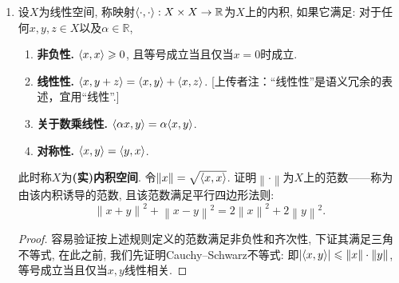 \begin{3b}
\begin{enumerate}
\begin{proof}
\begin{itemize}
\item $\partial(E')\subseteq\partial E\cap E'$:
对 $E_1$ 取等；对 $E_2$ 严格（左边 $\varnothing$，右边 $\mathbb{R}$）.

\item $(\partial E)'\subseteq\partial E\cap E'$:
对 $E_2$ 取等（均为 $\mathbb{R}$）；对 $E_1$ 严格（左边 $\varnothing$，右边 $\{0,1\}$）.

\item $\partial(\partial E)\subseteq\partial E$:
对 $E_1$ 取等（均为 $\{0,1\}$）；对 $E_3$ 严格（$\partial E_3=[0,1],\ \partial(\partial E_3)=\{0,1\}$）.

\item $(\overline{E})^\circ\supseteq E^\circ$:
对 $E_1$ 取等；对 $E_2$ 严格（$\mathbb{R}\supsetneq\varnothing$）.

\item $\partial(\overline{E})\subseteq\partial E$:
对 $E_1$ 取等；对 $E_3$ 严格（$\partial(\overline{E_3})=\{0,1\},\ \partial E_3=[0,1]$）.
\end{itemize}

\end{proof}
\item 设\(X\)为线性空间, 称映射\(\langle \cdot,\cdot \rangle:X\times X\rightarrow \mathbb{R}\)为\(X\)上的内积, 
如果它满足: 对于任何\(x,y,z\in X\)以及\(\alpha\in \mathbb{R}\),
\begin{enumerate}[label=(\arabic*)]
    \item \textbf{非负性.} \(\langle x,x \rangle\geqslant 0\), 且等号成立当且仅当\(x=0\)时成立.
    \item \textbf{线性性.} \(\langle x,y+z \rangle=\langle x,y \rangle+\langle x,z \rangle\). \textcolor{999966}{[上传者注：``线性性''是语义冗余的表述，宜用``线性''.]}
    \item \textbf{关于数乘线性.} \(\langle \alpha x,y \rangle=\alpha\langle x,y \rangle\).
    \item \textbf{对称性.} \(\langle x,y \rangle=\langle y,x \rangle\).
\end{enumerate}
此时称\(X\)为\textbf{(实)内积空间}. 令\(\left\|x\right\|=\sqrt{\langle x,x \rangle}\). 
证明\(\left\|\cdot\right\|\)为\(X\)上的范数------称为由该内积诱导的范数, 且该范数满足平行四边形法则:
\[\left\|x+y\right\|^2+\left\|x-y\right\|^2=2\left\|x\right\|^2+2\left\|y\right\|^2.\]
\begin{proof}
容易验证按上述规则定义的范数满足非负性和齐次性, 下证其满足三角不等式, 
在此之前, 我们先证明Cauchy--Schwarz不等式: 即\(\left|\langle x,y \rangle\right|\leqslant\left\|x\right\|\cdot\left\|y\right\|\), 等号成立当且仅当\(x,y\)线性相关.


\end{proof}
\end{enumerate}
\end{3b}
